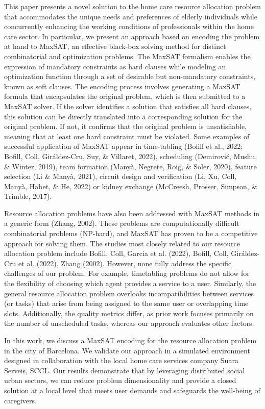 \documentclass[10pt]{article}
\begin{document}
This paper presents a novel solution to the home care resource allocation problem that accommodates the unique needs and preferences of elderly individuals while concurrently enhancing the working conditions of professionals within the home care sector. In particular, we present an approach based on encoding the problem at hand to MaxSAT, an effective black-box solving method for distinct combinatorial and optimization problems. The MaxSAT formalism enables the expression of mandatory constraints as hard clauses while modeling an optimization function through a set of desirable but non-mandatory constraints, known as soft clauses. The encoding process involves generating a MaxSAT formula that encapsulates the original problem, which is then submitted to a MaxSAT solver. If the solver identifies a solution that satisfies all hard clauses, this solution can be directly translated into a corresponding solution for the original problem. If not, it confirms that the original problem is unsatisfiable, meaning that at least one hard constraint must be violated. Some examples of successful application of MaxSAT appear in time-tabling (Bofill et al., 2022; Bofill, Coll, Giráldez-Cru, Suy, \& Villaret, 2022), scheduling (Demirović, Musliu, \& Winter, 2019), team formation (Manyà, Negrete, Roig, \& Soler, 2020), feature selection (Li \& Manyà, 2021), circuit design and verification (Li, Xu, Coll, Manyà, Habet, \& He, 2022) or kidney exchange (McCreesh, Prosser, Simpson, \& Trimble, 2017).

Resource allocation problems have also been addressed with MaxSAT methods in a generic form (Zhang, 2002). These problems are computationally difficult combinatorial problems (NP-hard), and MaxSAT has proven to be a competitive approach for solving them. The studies most closely related to our resource allocation problem include Bofill, Coll, Garcia et al. (2022), Bofill, Coll, Giráldez-Cru et al. (2022), Zhang (2002). However, none fully address the specific challenges of our problem. For example, timetabling problems do not allow for the flexibility of choosing which agent provides a service to a user. Similarly, the general resource allocation problem overlooks incompatibilities between services (or tasks) that arise from being assigned to the same user or overlapping time slots. Additionally, the quality metrics differ, as prior work focuses primarily on the number of unscheduled tasks, whereas our approach evaluates other factors.

In this work, we discuss a MaxSAT encoding for the resource allocation problem in the city of Barcelona. We validate our approach in a simulated environment designed in collaboration with the local home care services company Suara Serveis, SCCL. Our results demonstrate that by leveraging distributed social urban sectors, we can reduce problem dimensionality and provide a closed solution at a local level that meets user demands and safeguards the well-being of caregivers.
\end{document}
